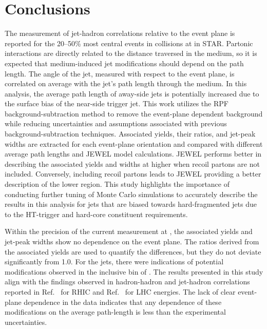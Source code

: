\section{Conclusions} \label{sect:Summary}
The measurement of jet-hadron correlations relative to the event plane is reported for the 20--50\% most central events in \AuAu collisions at  in STAR. 
%
Partonic interactions are directly related to the distance traversed in the medium, so it is expected that medium-induced jet modifications should depend on the path length. 
%
The angle of the jet, measured with respect to the event plane, is correlated on average with the jet's path length through the medium. 
%
In this analysis, the average path length of away-side jets is potentially increased due to the surface bias of the near-side trigger jet. 
%
This work utilizes the RPF background-subtraction method to remove the event-plane dependent background while reducing uncertainties and assumptions associated with previous background-subtraction techniques. 
%
Associated yields, their ratios, and jet-peak widths are extracted for each event-plane orientation and compared with different average path lengths and JEWEL model calculations. 
%
JEWEL performs better in describing the associated yields and widths at higher  when recoil partons are not included. 
%
Conversely, including recoil partons leads to JEWEL providing a better description of the lower  region. 
%
This study highlights the importance of conducting further tuning of Monte Carlo simulations to accurately describe the results in this analysis for jets that are biased towards hard-fragmented jets due to the HT-trigger and hard-core constituent requirements.

Within the precision of the current measurement at , the associated yields and jet-peak widths show no dependence on the event plane. 
%
The ratios derived from the associated yields are used to quantify the differences, but they do not deviate significantly from 1.0. For the  jets, there were indications of potential modifications observed in the inclusive bin of .
%
The results presented in this study align with the findings observed in hadron-hadron and jet-hadron correlations reported in Ref.~\cite{Nattrass:2016cln} for RHIC and  Ref.~\cite{PhysRevC.101.064901} for LHC energies.  
%
The lack of clear event-plane dependence in the data indicates that any dependence of these modifications on the average path-length is less than the experimental uncertainties.